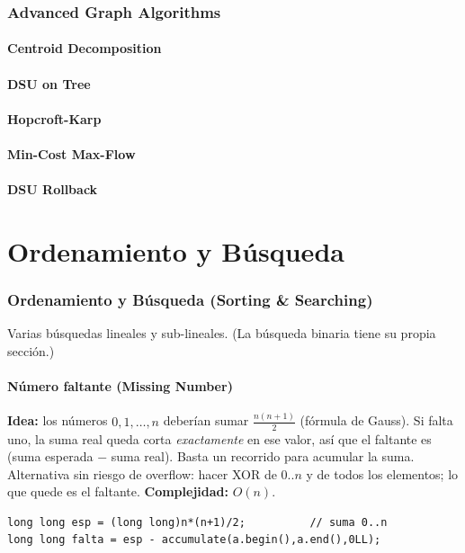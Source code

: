 \documentclass[10pt,a4paper,twocolumn]{article}
\begin{document}

\section{Advanced Graph Algorithms}

\subsection{Centroid Decomposition}

\subsection{DSU on Tree}

\subsection{Hopcroft-Karp}

\subsection{Min-Cost Max-Flow}

\subsection{DSU Rollback}

\part{Ordenamiento y Búsqueda}

\section{Ordenamiento y Búsqueda (Sorting \& Searching)}
Varias búsquedas lineales y sub-lineales. (La búsqueda binaria tiene
su propia sección.)

\subsection{Número faltante (Missing Number)}
\textbf{Idea:} los números $0,1,\dots,n$ deberían sumar
$\frac{n(n+1)}{2}$ (fórmula de Gauss). Si falta uno, la suma real queda
corta \emph{exactamente} en ese valor, así que el faltante es
(suma esperada $-$ suma real). Basta un recorrido para acumular la suma.
Alternativa sin riesgo de overflow: hacer XOR de $0..n$ y de todos los
elementos; lo que quede es el faltante. \textbf{Complejidad:} $O(n)$.
\begin{lstlisting}[style=cpp]
long long esp = (long long)n*(n+1)/2;          // suma 0..n
long long falta = esp - accumulate(a.begin(),a.end(),0LL);
\end{lstlisting}
\end{document}
